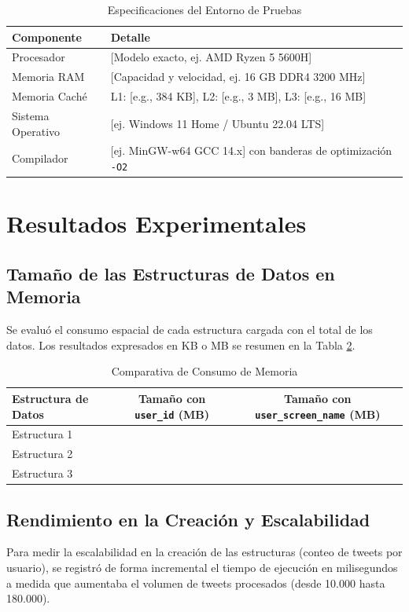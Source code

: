 \documentclass[11pt,letterpaper]{article}
\begin{document}
\begin{table}[h!]
\centering
\caption{Especificaciones del Entorno de Pruebas}
\label{tab:hardware}
\begin{tabular}{ll}
\toprule
\textbf{Componente} & \textbf{Detalle} \\
\midrule
Procesador & [Modelo exacto, ej. AMD Ryzen 5 5600H] \\
Memoria RAM & [Capacidad y velocidad, ej. 16 GB DDR4 3200 MHz] \\
Memoria Caché & L1: [e.g., 384 KB], L2: [e.g., 3 MB], L3: [e.g., 16 MB] \\
Sistema Operativo & [ej. Windows 11 Home / Ubuntu 22.04 LTS] \\
Compilador & [ej. MinGW-w64 GCC 14.x] con banderas de optimización \texttt{-O2} \\
\bottomrule
\end{tabular}
\end{table}


\section{Resultados Experimentales}
\label{sec:resultados}

\subsection{Tamaño de las Estructuras de Datos en Memoria}
Se evaluó el consumo espacial de cada estructura cargada con el total de los datos. Los resultados expresados en KB o MB se resumen en la Tabla \ref{tab:memoria}.

\begin{table}[h!]
\centering
\caption{Comparativa de Consumo de Memoria}
\label{tab:memoria}
\begin{tabular}{lcc}
\toprule
\textbf{Estructura de Datos} & \textbf{Tamaño con \texttt{user\_id} (MB)} & \textbf{Tamaño con \texttt{user\_screen\_name} (MB)} \\
\midrule
Estructura 1 & & \\
Estructura 2 & & \\
Estructura 3 & & \\
\bottomrule
\end{tabular}
\end{table}

\subsection{Rendimiento en la Creación y Escalabilidad}
Para medir la escalabilidad en la creación de las estructuras (conteo de tweets por usuario), se registró de forma incremental el tiempo de ejecución en milisegundos a medida que aumentaba el volumen de tweets procesados (desde 10.000 hasta 180.000). 
\end{document}
